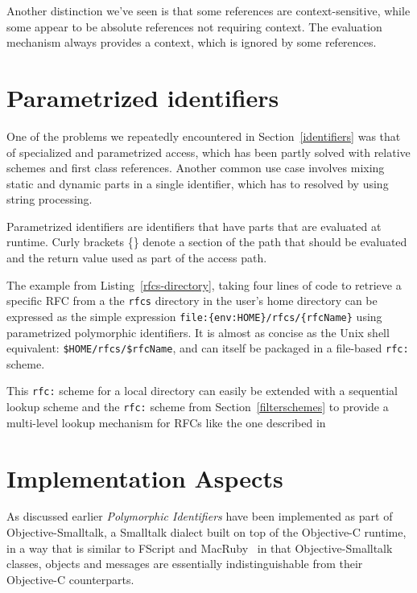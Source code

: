\documentclass[preprint]{sigplanconf}
\begin{document}
Another distinction we've seen is that some references are context-sensitive, while some
appear to be absolute references not requiring context.  The evaluation mechanism always
provides a context, which is ignored by some references.  


\section{Parametrized identifiers}
\label{parametrized}

One of the problems we repeatedly encountered in Section~\ref{identifiers} was 
that of specialized and parametrized access, which has been partly solved with
relative schemes and first class references.  Another common use case involves
mixing static and dynamic parts in a single identifier, which has to resolved by
using string processing.

Parametrized identifiers are identifiers that have parts that are evaluated
at runtime.  Curly brackets \{\} denote a section of the path that should be evaluated and
the return value used as part of the access path.

The example from Listing~\ref{rfcs-directory}, taking four lines of code to retrieve a specific RFC from a 
the {\tt rfcs} directory in the user's home directory can be expressed as the simple expression
{\tt file:\{env:HOME\}/rfcs/\{rfcName\}} using parametrized polymorphic identifiers.  It is almost
as concise as the Unix shell equivalent: {\tt \$HOME/rfcs/\$rfcName}, and can itself be packaged
in a file-based {\tt rfc:} scheme. 

This {\tt rfc:} scheme for a local directory can easily be extended with a sequential lookup scheme
and the {\tt rfc:} scheme from Section~\ref{filterschemes} to provide a multi-level lookup mechanism
for RFCs like the one described in 



\section{Implementation Aspects}
\label{implementation}

As discussed earlier \emph{Polymorphic Identifiers} have been implemented as part of Objective-Smalltalk,
a Smalltalk dialect built on top of the Objective-C\cite{objc-evol}\cite{objc-apple} runtime, 
in a way that is similar to FScript\cite{fscript} and MacRuby~\cite{macruby} in that Objective-Smalltalk classes,
objects and messages are essentially indistinguishable from their Objective-C counterparts.
\end{document}
